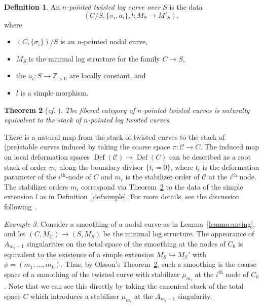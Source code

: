 \documentclass[11pt]{amsart}
\numberwithin{equation}{section}
\newtheorem{theorem}{Theorem}[section]
\theoremstyle{definition}
\newtheorem{definition}[theorem]{Definition}
\theoremstyle{remark}
\newtheorem{example}[theorem]{Example}
\DeclareMathOperator{\Def}{Def}
\newcommand{\calC}{\mathcal C}
\newcommand{\supth}[1]{\ensuremath{#1^{\mathrm{th}}}}
\begin{document}
\begin{definition}
An \emph{$n$-pointed twisted log curve over $S$} is the data
\[ (C/S, \{\sigma_i, a_i\}, l\colon M_S \to M'_S),\]
where 
\begin{itemize}
    \item $(C, \{\sigma_i\})/S$ is an $n$-pointed nodal curve,
    \item $M_S$ is the minimal log structure for the family $C \to S$,
    \item the $a_i\colon  S \to \mathbb{Z}_{>0}$ are locally constant, and
    \item $l$ is a simple morphism.
\end{itemize}
\end{definition}


\begin{theorem}[\textit{cf.} ]\label{thm:olsson}
The fibered category of $n$-pointed twisted curves is naturally equivalent to the stack of $n$-pointed log twisted curves. \end{theorem}

There is a natural map from the stack of twisted curves to the stack of (pre)stable curves induced by taking the coarse space $\pi \colon  \calC \to C$. The induced map on local deformation spaces $\Def(\calC) \to \Def(C)$ can be described as a root stack of order $m_i$ along the boundary divisor $\{t_i = 0\}$, where $t_i$ is the deformation parameter of the $\supth{i}$-node of $C$ and $m_i$ is the stabilizer order of $\calC$ at the $\supth{i}$ node. The stabilizer orders $m_i$ correspond via Theorem~\ref{thm:olsson} to the data of the simple extension $l$ as in Definition~\ref{def:simple}. For more details, see the discussion following~\cite[Theorem 1.9 and Remark 1.10]{Olsson}. 

\begin{example} \label{rem:sing} Consider a smoothing of a nodal curve as in Lemma~\ref{lemma:ansing}, and let $(C, M_C) \to (S, M_S)$ be the minimal log structure. The appearance of $A_{m_i-1}$ singularities on the total space of the smoothing at the nodes of $C_0$ is equivalent to the existence of a simple extension $M_S \hookrightarrow M_S'$ with $\phi = (m_1, \ldots, m_k)$. Thus, by Olsson's Theorem~\ref{thm:olsson}, such a smoothing is the coarse space of a smoothing of the twisted curve with stabilizer $\mu_{m_i}$ at the $\supth{i}$ node of $C_0$. Note that we can see this directly by taking the canonical stack of the total space $C$ which introduces a stabilizer  $\mu_{m_i}$  at the $A_{m_i - 1}$ singularity. 
\end{example} 
\end{document}
